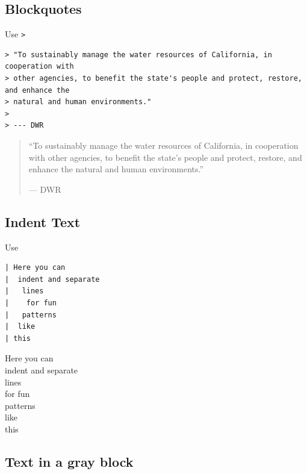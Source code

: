 \documentclass[
]{book}
\begin{document}
\hypertarget{blockquotes}{%
\subsection{Blockquotes}\label{blockquotes}}

Use \texttt{\textgreater{}}

\begin{verbatim}
> "To sustainably manage the water resources of California, in cooperation with 
> other agencies, to benefit the state's people and protect, restore, and enhance the
> natural and human environments." 
> 
> --- DWR
\end{verbatim}

\begin{quote}
``To sustainably manage the water resources of California, in cooperation with other
agencies, to benefit the state's people and protect, restore, and
enhance the natural and human environments.''

--- DWR
\end{quote}

\hypertarget{indent-text}{%
\subsection{Indent Text}\label{indent-text}}

Use \texttt{\textbar{}}

\begin{verbatim}
| Here you can 
|  indent and separate 
|   lines
|    for fun 
|   patterns
|  like
| this 
\end{verbatim}

Here you can\\
\hspace*{0.333em}indent and separate\\
\hspace*{0.333em}\hspace*{0.333em}lines\\
\hspace*{0.333em}\hspace*{0.333em}\hspace*{0.333em}for fun\\
\hspace*{0.333em}\hspace*{0.333em}patterns\\
\hspace*{0.333em}like\\
this

\hypertarget{text-in-a-gray-block}{%
\subsection{Text in a gray block}\label{text-in-a-gray-block}}
\end{document}
